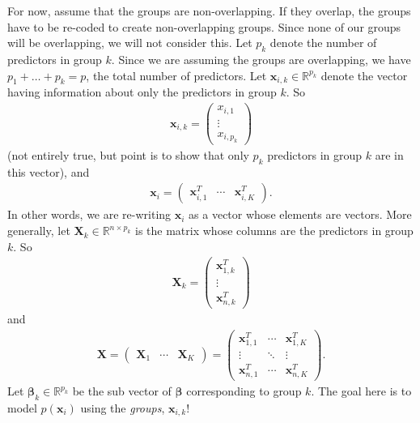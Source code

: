 \documentclass[10pt]{article}
\begin{document}
For now, assume that the groups are non-overlapping. If they overlap, the groups have to be re-coded to create non-overlapping groups. Since none of our groups will be overlapping, we will not consider this. Let $p_k$ denote the number of predictors in group $k$. Since we are assuming the groups are overlapping, we have $p_1 + \ldots + p_k = p$, the total number of predictors. Let $\bm{x}_{i,k} \in \mathbb{R}^{p_k}$ denote the vector having information about only the predictors in group $k$. So 
\begin{align*}
    \bm{x}_{i,k} = \begin{pmatrix}
        x_{i,1} \\ \vdots \\ x_{i, p_k}
        \end{pmatrix}
\end{align*}
(not entirely true, but point is to show that only $p_k$ predictors in group $k$ are in this vector), and 
\begin{align*}
    \bm{x}_i = \begin{pmatrix}
    \bm{x}_{i,1}^T & \cdots & \bm{x}_{i,K}^T
    \end{pmatrix}.
\end{align*}
In other words, we are re-writing $\bm{x}_i$ as a vector whose elements are vectors. 
More generally, let $\mathbf{X}_k \in \mathbb{R}^{n \times p_k}$ is the matrix whose columns are the predictors in group $k$. So 
\begin{align*}
    \mathbf{X}_k = \begin{pmatrix}
    \bm{x}_{1,k}^T \\
    \vdots \\
    \bm{x}_{n,k}^T
    \end{pmatrix}
\end{align*}
and 
\begin{align*}
\mathbf{X} = \begin{pmatrix}
\mathbf{X}_1 & \cdots & \mathbf{X}_K
\end{pmatrix} = \begin{pmatrix}
\bm{x}_{1,1}^T & \cdots & \bm{x}_{1,K}^T \\
\vdots & \ddots & \vdots \\
\bm{x}_{n,1}^T & \cdots & \bm{x}_{n,K}^T
\end{pmatrix}.
\end{align*}
Let $\bm{\beta}_k \in \mathbb{R}^{p_k}$ be the sub vector of $\bm{\beta}$ corresponding to group $k$. The goal here is to model $p(\bm{x}_i)$ using the \textit{groups}, $\bm{x}_{i,k}$!
\end{document}
